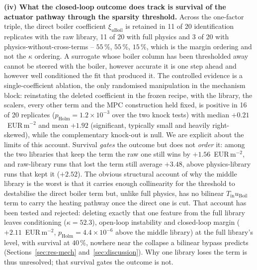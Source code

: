 \textbf{(iv) What the closed-loop outcome does track is survival of the actuator
pathway through the sparsity threshold.} Across the one-factor triple, the direct boiler
coefficient $\xi_{u\mathrm{Boil}}$ is retained in 11 of 20 identification replicates with
the raw library, 11 of 20 with full physics and 3 of 20 with physics-without-cross-terms
-- $55\,\%$, $55\,\%$, $15\,\%$, which is the margin ordering and not the $\kappa$
ordering. A surrogate whose boiler column has been thresholded away cannot be steered
with the boiler, however accurate it is one step ahead and however well conditioned the
fit that produced it. The controlled evidence is a single-coefficient ablation, the only
randomised manipulation in the mechanism block: reinstating the deleted coefficient in
the frozen recipe, with the library, the scalers, every other term and the MPC
construction held fixed, is positive in 16 of 20 replicates
($p_{\mathrm{Holm}} = 1.2 \times 10^{-3}$ over the two knock tests) with median
$+0.21$~EUR\,m$^{-2}$ and mean
$+1.92$ (significant, typically small and heavily right-skewed), while the
complementary knock-out is null. We are explicit about the limits of this account.
Survival \emph{gates} the outcome but does not \emph{order} it: among the two libraries
that keep the term the raw one still wins by $+1.56$~EUR\,m$^{-2}$, and raw-library runs
that lost the term still average $+3.48$, above physics-library runs that kept it
($+2.52$). The obvious structural account of why the middle library is the worst is
that it carries enough collinearity for the threshold to destabilise the direct boiler
term but, unlike full physics, has no bilinear $T_{\mathrm{in}}u_{\mathrm{Boil}}$ term to
carry the heating pathway once the direct one is cut. That account has been tested and
rejected: deleting exactly that one feature from the full library leaves conditioning
($\kappa = 52.3$), open-loop instability and closed-loop margin ($+2.11$~EUR\,m$^{-2}$,
$p_{\mathrm{Holm}} = 4.4 \times 10^{-6}$ above the middle library) at the full library's
level, with survival at $40\,\%$, nowhere near the collapse a bilinear bypass predicts
(Sections~\ref{sec:res-mech} and~\ref{sec:discussion}). Why one library loses the term is
thus unresolved; that survival gates the outcome is not.

